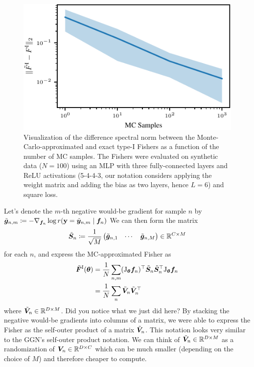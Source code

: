
\begin{figure}
  \centering
  \includegraphics[width=\linewidth]{../kfs/plots/synthetic_rvec_diff_spec_norm.pdf}
  \caption{Visualization of the difference spectral norm between the Monte-Carlo-approximated and exact type-I Fishers as a function of the number of MC samples.
    The Fishers were evaluated on synthetic data ($N=100$) using an MLP with three fully-connected layers and ReLU activations (5-4-4-3, our notation considers applying the weight matrix and adding the bias as two layers, hence $L=6$) and square loss.
  }
\end{figure}

\switchcolumn[0]

Let's denote the $m$-th negative would-be gradient for sample $n$ by $\tilde{{\bm{g}}}_{n,m} \coloneq -\nabla_{{\bm{f}}_n} \log r({\mathbf{y}} = \tilde{{\bm{y}}}_{n,m} \mid {\bm{f}}_n)$
We can then form the matrix
\begin{align*}
  \tilde{{\bm{S}}}_n
  \coloneq
  \frac{1}{\sqrt{M}}
  \begin{pmatrix}
    \tilde{{\bm{g}}}_{n,1} & \cdots & \tilde{{\bm{g}}}_{n,M}
  \end{pmatrix}
  \in {\mathbb{R}}^{C \times M}
\end{align*}
for each $n$, and express the MC-approximated Fisher as
\begin{align*}
  \tilde{{\bm{F}}}^{\text{I}}({\bm{\theta}})
   & =
  \frac{1}{N} \sum_{n,m}
  (\mathrm{J}_{{\bm{\theta}}}{\bm{f}}_n)^{\top}
  \tilde{{\bm{S}}}_n
  \tilde{{\bm{S}}}_n^{\top}
  \mathrm{J}_{{\bm{\theta}}}{\bm{f}}_n
  \\
   & =
  \frac{1}{N} \sum_n
  \tilde{{\bm{V}}}_n
  \tilde{{\bm{V}}}_n^{\top}
\end{align*}
where $\tilde{{\bm{V}}}_n \in {\mathbb{R}}^{D \times M}$.
Did you notice what we just did here?
By stacking the negative would-be gradients into columns of a matrix, we were able to express the Fisher as the self-outer product of a matrix $\tilde{{\bm{V}}}_n$.
This notation looks very similar to the GGN's self-outer product notation.
We can think of $\tilde{{\bm{V}}}_n \in {\mathbb{R}}^{D \times M}$ as a randomization of ${\bm{V}}_n \in {\mathbb{R}}^{D \times C}$ which can be much smaller (depending on the choice of $M$) and therefore cheaper to compute.

